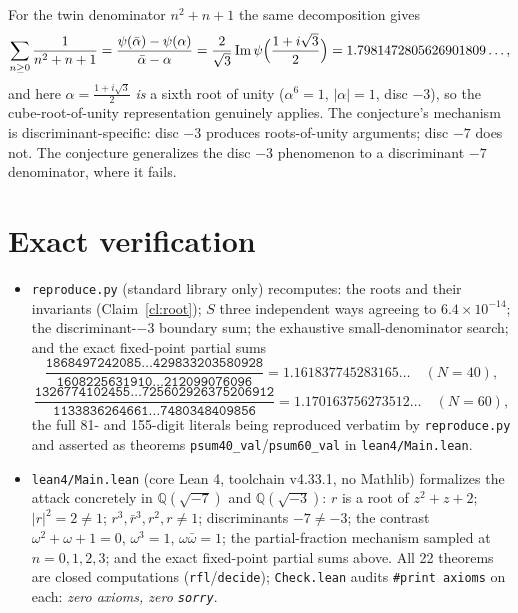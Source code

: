 \documentclass[11pt]{article}
\newcommand{\ii}{\ensuremath{i}}
\newcommand{\ps}{\psi}
\begin{document}
For the twin denominator $n^2+n+1$ the same decomposition gives
\[
\sum_{n\ge0}\frac1{n^2+n+1}
=\frac{\ps(\bar\alpha)-\ps(\alpha)}{\bar\alpha-\alpha}
=\frac{2}{\sqrt3}\operatorname{Im}\ps\Bigl(\frac{1+\ii\sqrt3}{2}\Bigr)
=1.7981472805626901809\ldots,
\]
and here $\alpha=\tfrac{1+\ii\sqrt3}{2}$ \emph{is} a sixth root of unity
($\alpha^6=1$, $|\alpha|=1$, disc $-3$), so the cube-root-of-unity representation genuinely
applies. The conjecture's mechanism is discriminant-specific: disc $-3$ produces roots-of-unity
arguments; disc $-7$ does not. The conjecture generalizes the disc $-3$ phenomenon to a
discriminant $-7$ denominator, where it fails.

\section{Exact verification}

\begin{itemize}
\item \texttt{reproduce.py} (standard library only) recomputes: the roots and their invariants
(Claim~\ref{cl:root}); $S$ three independent ways agreeing to $6.4\times10^{-14}$; the
discriminant-$-3$ boundary sum; the exhaustive small-denominator search; and the exact
fixed-point partial sums
\[
\frac{\texttt{1868497242085\ldots429833203580928}}{\texttt{1608225631910\ldots212099076096}}
=1.161837745283165\ldots \quad (N=40),
\]
\[
\frac{\texttt{1326774102455\ldots725602926375206912}}{\texttt{1133836264661\ldots7480348409856}}
=1.170163756273512\ldots \quad (N=60),
\]
the full 81- and 155-digit literals being reproduced verbatim by \texttt{reproduce.py} and
asserted as theorems \texttt{psum40\_val}/\texttt{psum60\_val} in \texttt{lean4/Main.lean}.
\item \texttt{lean4/Main.lean} (core Lean 4, toolchain v4.33.1, no Mathlib) formalizes the
attack concretely in $\mathbb{Q}(\sqrt{-7})$ and $\mathbb{Q}(\sqrt{-3})$:
$r$ is a root of $z^2+z+2$; $|r|^2=2\ne1$; $r^3,\bar r^3,r^2,r\ne1$; discriminants $-7\ne-3$;
the contrast $\omega^2+\omega+1=0$, $\omega^3=1$, $\omega\bar\omega=1$; the partial-fraction
mechanism sampled at $n=0,1,2,3$; and the exact fixed-point partial sums above.
All 22 theorems are closed computations (\texttt{rfl}/\texttt{decide});
\texttt{Check.lean} audits \texttt{\#print axioms} on each: \emph{zero axioms, zero
\texttt{sorry}}.
\end{itemize}
\end{document}
